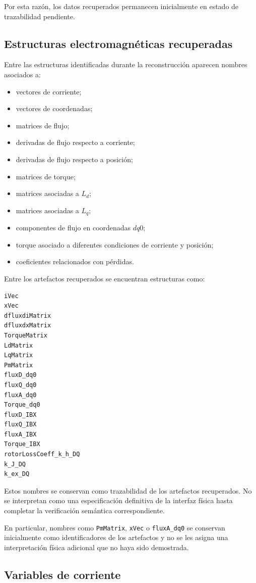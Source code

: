 Por esta razón, los datos recuperados permanecen inicialmente en estado de trazabilidad pendiente.

\subsection{Estructuras electromagnéticas recuperadas}

Entre las estructuras identificadas durante la reconstrucción aparecen nombres asociados a:

\begin{itemize}
\item vectores de corriente;
\item vectores de coordenadas;
\item matrices de flujo;
\item derivadas de flujo respecto a corriente;
\item derivadas de flujo respecto a posición;
\item matrices de torque;
\item matrices asociadas a $L_d$;
\item matrices asociadas a $L_q$;
\item componentes de flujo en coordenadas $dq0$;
\item torque asociado a diferentes condiciones de corriente y posición;
\item coeficientes relacionados con pérdidas.
\end{itemize}

Entre los artefactos recuperados se encuentran estructuras como:

\begin{verbatim}
iVec
xVec
dfluxdiMatrix
dfluxdxMatrix
TorqueMatrix
LdMatrix
LqMatrix
PmMatrix
fluxD_dq0
fluxQ_dq0
fluxA_dq0
Torque_dq0
fluxD_IBX
fluxQ_IBX
fluxA_IBX
Torque_IBX
rotorLossCoeff_k_h_DQ
k_J_DQ
k_ex_DQ
\end{verbatim}

Estos nombres se conservan como trazabilidad de los artefactos recuperados. No se interpretan como una especificación definitiva de la interfaz física hasta completar la verificación semántica correspondiente.

En particular, nombres como \texttt{PmMatrix}, \texttt{xVec} o \texttt{fluxA\_dq0} se conservan inicialmente como identificadores de los artefactos y no se les asigna una interpretación física adicional que no haya sido demostrada.

\subsection{Variables de corriente}

